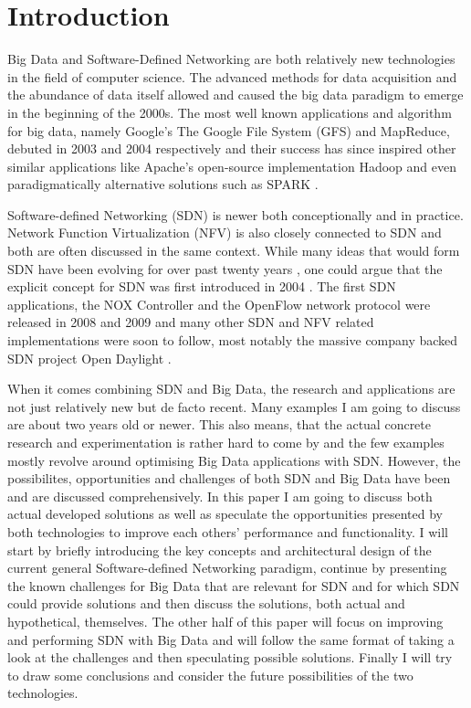 \documentclass{acm_proc_article-sp}
\begin{document}


\section{Introduction}
Big Data and Software-Defined Networking are both relatively new technologies in the field of computer science. The advanced methods for data acquisition and the abundance of data itself allowed and caused the big data paradigm to emerge in the beginning of the 2000s. The most well known applications and algorithm for big data, namely Google's The Google File System (GFS) and MapReduce, debuted in 2003 and 2004 respectively \cite{Ghemawat:2003:GFS:1165389.945450,Dean:2008:MSD:1327452.1327492} and their success has since inspired other similar applications like Apache's open-source implementation Hadoop \cite{Hadoop} and even paradigmatically alternative solutions such as SPARK \cite{Spark}.

Software-defined Networking (SDN) is newer both conceptionally and in practice. Network Function Virtualization (NFV) is also closely connected to SDN and both are often discussed in the same context. While many ideas that would form SDN have been evolving for over past twenty years \cite{Feamster:2013:RS:2559899.2560327}, one could argue that the explicit concept for SDN was first introduced in 2004 \cite{robert2012system}. The first SDN applications, the NOX Controller \cite{NOX} and the OpenFlow network protocol \cite{McKeown-CCR2008}  were released in 2008 and 2009 and many other SDN and NFV related implementations were soon to follow, most notably the massive company backed SDN project Open Daylight \cite{ODL}.

When it comes combining SDN and Big Data, the research and applications are not just relatively new but de facto recent. Many examples I am going to discuss are about two years old or newer. This also means, that the actual concrete research and experimentation is rather hard to come by and the few examples mostly revolve around optimising Big Data applications with SDN. However, the possibilites, opportunities and challenges of both SDN and Big Data have been and are discussed comprehensively. In this paper I am going to discuss both actual developed solutions as well as speculate the opportunities presented by both technologies to improve each others' performance and functionality. I will start by briefly introducing the key concepts and architectural design of the current general Software-defined Networking paradigm, continue by presenting the known challenges for Big Data that are relevant for SDN and for which SDN could provide solutions and then discuss the solutions, both actual and hypothetical, themselves. The other half of this paper will focus on improving and performing SDN with Big Data and will follow the same format of taking a look at the challenges and then speculating possible solutions. Finally I will try to draw some conclusions and consider the future possibilities of the two technologies. 
\end{document}
